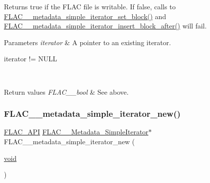 Returns {\ttfamily true} if the F\+L\+AC file is writable. If {\ttfamily false}, calls to \hyperlink{group__flac__metadata__level1_ga7d1ceb2db292c968ae6ac18ecb15c356}{F\+L\+A\+C\+\_\+\+\_\+metadata\+\_\+simple\+\_\+iterator\+\_\+set\+\_\+block()} and \hyperlink{group__flac__metadata__level1_ga1239ccc5ae1dc3f7cb0e1a61707fafc6}{F\+L\+A\+C\+\_\+\+\_\+metadata\+\_\+simple\+\_\+iterator\+\_\+insert\+\_\+block\+\_\+after()} will fail.


\begin{DoxyParams}{Parameters}
{\em iterator} & A pointer to an existing iterator.  
\begin{DoxyCode}
iterator != NULL 
\end{DoxyCode}
 \\
\hline
\end{DoxyParams}

\begin{DoxyRetVals}{Return values}
{\em F\+L\+A\+C\+\_\+\+\_\+bool} & See above. \\
\hline
\end{DoxyRetVals}
\mbox{\label{group__flac__metadata__level1_ga5b32f4eba211e05727428e9080f4e393}} 
\subsubsection{\texorpdfstring{F\+L\+A\+C\+\_\+\+\_\+metadata\+\_\+simple\+\_\+iterator\+\_\+new()}{FLAC\_\_metadata\_simple\_iterator\_new()}}
{\footnotesize\ttfamily \hyperlink{group__flac__export_ga56ca07df8a23310707732b1c0007d6f5}{F\+L\+A\+C\+\_\+\+A\+PI} \hyperlink{group__flac__metadata__level1_ga6accccddbb867dfc2eece9ee3ffecb3a}{F\+L\+A\+C\+\_\+\+\_\+\+Metadata\+\_\+\+Simple\+Iterator}$\ast$ F\+L\+A\+C\+\_\+\+\_\+metadata\+\_\+simple\+\_\+iterator\+\_\+new (\begin{DoxyParamCaption}\item[{\hyperlink{png_8h_ac9c84fa68bbad002983e35ce3663c686}{void}}]{ }\end{DoxyParamCaption})}

